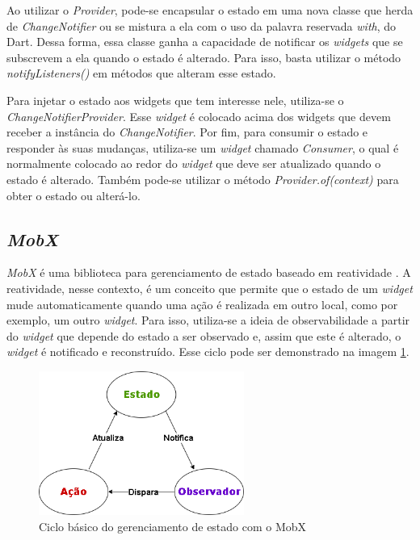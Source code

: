 Ao utilizar o \textit{Provider}, pode-se encapsular o estado em uma nova classe que herda de \textit{ChangeNotifier} ou se mistura a ela com o uso da palavra reservada \textit{with}, do Dart. Dessa forma, essa classe ganha a capacidade de notificar os \textit{widgets} que se subscrevem a ela quando o estado é alterado. Para isso, basta utilizar o método \textit{notifyListeners()} em métodos que alteram esse estado.

Para injetar o estado aos widgets que tem interesse nele, utiliza-se o \textit{ChangeNotifierProvider}. Esse \textit{widget} é colocado acima dos widgets que devem receber a instância do \textit{ChangeNotifier}. Por fim, para consumir o estado e responder às suas mudanças, utiliza-se um \textit{widget} chamado \textit{Consumer}, o qual é normalmente colocado ao redor do \textit{widget} que deve ser atualizado quando o estado é alterado. Também pode-se utilizar o método \textit{Provider.of(context)} para obter o estado ou alterá-lo.

\subsection{\textit{MobX}}
\label{cap2:Subsec:MobX}
\textit{MobX} é uma biblioteca para gerenciamento de estado baseado em reatividade \cite{mobx-package}. A reatividade, nesse contexto, é um conceito que permite que o estado de um \textit{widget} mude automaticamente quando uma ação é realizada em outro local, como por exemplo, um outro \textit{widget}. Para isso, utiliza-se a ideia de observabilidade a partir do \textit{widget} que depende do estado a ser observado e, assim que este é alterado, o \textit{widget} é notificado e reconstruído. Esse ciclo pode ser demonstrado na imagem \ref{fig:mobx-cycle}.


\begin{figure}[!ht]
  \centering
  \includegraphics[width=0.6\textwidth]{figuras/cap2/2_2_6_mobx-cycle.png}
  \caption{Ciclo básico do gerenciamento de estado com o MobX \protect\cite{mobx-package} \protect\cite{podila18mobx}}
  \label{fig:mobx-cycle}
\end{figure}


